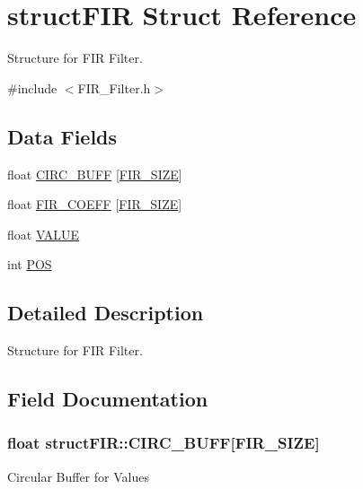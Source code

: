 \hypertarget{structstruct_f_i_r}{}\section{struct\+F\+IR Struct Reference}
\label{structstruct_f_i_r}


Structure for F\+IR Filter.  




{\ttfamily \#include $<$F\+I\+R\+\_\+\+Filter.\+h$>$}

\subsection*{Data Fields}
\begin{DoxyCompactItemize}
\item 
float \hyperlink{structstruct_f_i_r_a8879bfece08b846b099f3458e6634c18}{C\+I\+R\+C\+\_\+\+B\+U\+FF} \mbox{[}\hyperlink{_f_i_r___filter_8h_a4e07e07d81d0c866ba12d4230e9ff1bb}{F\+I\+R\+\_\+\+S\+I\+ZE}\mbox{]}
\item 
float \hyperlink{structstruct_f_i_r_a930c70fc9a12392e35058698cfeea2bd}{F\+I\+R\+\_\+\+C\+O\+E\+FF} \mbox{[}\hyperlink{_f_i_r___filter_8h_a4e07e07d81d0c866ba12d4230e9ff1bb}{F\+I\+R\+\_\+\+S\+I\+ZE}\mbox{]}
\item 
float \hyperlink{structstruct_f_i_r_adde9a344645a4e3316dc0db7674427c2}{V\+A\+L\+UE}
\item 
int \hyperlink{structstruct_f_i_r_a1ec2eb19d75618bb41d6ac0644628a00}{P\+OS}
\end{DoxyCompactItemize}


\subsection{Detailed Description}
Structure for F\+IR Filter. 

\subsection{Field Documentation}
\subsubsection[{\texorpdfstring{C\+I\+R\+C\+\_\+\+B\+U\+FF}{CIRC_BUFF}}]{\setlength{\rightskip}{0pt plus 5cm}float struct\+F\+I\+R\+::\+C\+I\+R\+C\+\_\+\+B\+U\+FF\mbox{[}{\bf F\+I\+R\+\_\+\+S\+I\+ZE}\mbox{]}}\hypertarget{structstruct_f_i_r_a8879bfece08b846b099f3458e6634c18}{}\label{structstruct_f_i_r_a8879bfece08b846b099f3458e6634c18}
Circular Buffer for Values 
